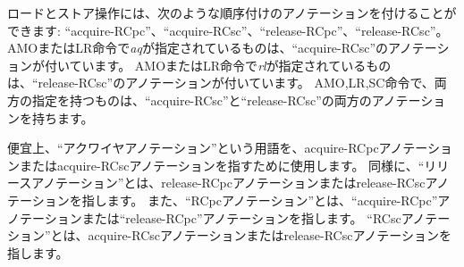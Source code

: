\begin{comment}
Load and store operations may also carry one or more ordering annotations from the following set: ``acquire-RCpc'', ``acquire-RCsc'', ``release-RCpc'', and ``release-RCsc''.
An AMO or LR instruction with {\em aq} set has an ``acquire-RCsc'' annotation.
An AMO or SC instruction with {\em rl} set has a ``release-RCsc'' annotation.
An AMO, LR, or SC instruction with both {\em aq} and {\em rl} set has both ``acquire-RCsc'' and ``release-RCsc'' annotations.
\end{comment}

ロードとストア操作には、次のような順序付けのアノテーションを付けることができます: ``acquire-RCpc''、``acquire-RCsc''、``release-RCpc''、``release-RCsc''。
AMOまたはLR命令で{\em aq}が指定されているものは、``acquire-RCsc''のアノテーションが付いています。
AMOまたはLR命令で{\em rl}が指定されているものは、``release-RCsc''のアノテーションが付いています。
AMO,LR,SC命令で、両方の指定を持つものは、``acquire-RCsc''と``release-RCsc''の両方のアノテーションを持ちます。

\begin{comment}
For convenience, we use the term ``acquire annotation'' to refer to an acquire-RCpc annotation or an acquire-RCsc annotation.
Likewise, a ``release annotation'' refers to a release-RCpc annotation or a release-RCsc annotation.
An ``RCpc annotation'' refers to an acquire-RCpc annotation or a release-RCpc annotation.
An ``RCsc annotation'' refers to an acquire-RCsc annotation or a release-RCsc annotation.
\end{comment}

便宜上、``アクワイヤアノテーション''という用語を、acquire-RCpcアノテーションまたはacquire-RCscアノテーションを指すために使用します。
同様に、``リリースアノテーション''とは、release-RCpcアノテーションまたはrelease-RCscアノテーションを指します。
また、``RCpcアノテーション''とは、``acquire-RCpc''アノテーションまたは``release-RCpc''アノテーションを指します。
``RCscアノテーション''とは、acquire-RCscアノテーションまたはrelease-RCscアノテーションを指します。

